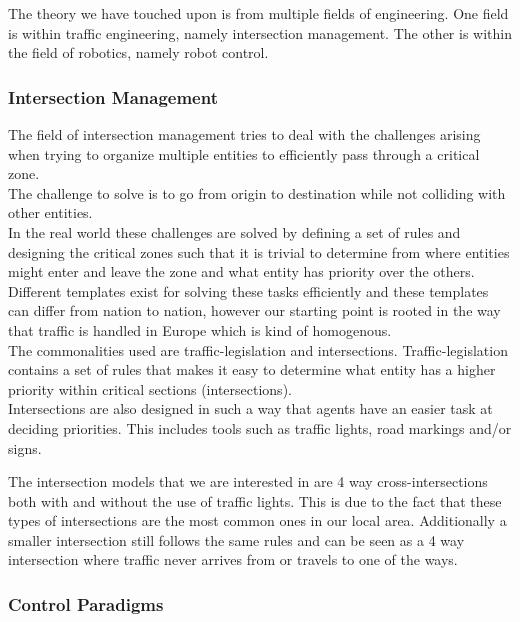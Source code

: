 The theory we have touched upon is from multiple fields of engineering. One field is within traffic engineering, namely intersection management. The other is within the field of robotics, namely robot control.

\subsubsection{Intersection Management}
The field of intersection management tries to deal with the challenges arising when trying to organize multiple entities to efficiently pass through a critical zone.\\
The challenge to solve is to go from origin to destination while not colliding with other entities.\\

In the real world these challenges are solved by defining a set of rules and designing the critical zones such that it is trivial to determine from where entities might enter and leave the zone and what entity has priority over the others.\\

Different templates exist for solving these tasks efficiently and these templates can differ from nation to nation, however our starting point is rooted in the way that traffic is handled in Europe which is kind of homogenous.\\

The commonalities used are traffic-legislation and intersections.
Traffic-legislation contains a set of rules that makes it easy to determine what entity has a higher priority within critical sections (intersections).\\
Intersections are also designed in such a way that agents have an easier task at deciding priorities. 
This includes tools such as traffic lights, road markings and/or signs.

The intersection models that we are interested in are 4 way cross-intersections both with and without the use of traffic lights.
This is due to the fact that these types of intersections are the most common ones in our local area. Additionally a smaller intersection still follows the same rules and can be seen as a 4 way intersection where traffic never arrives from or travels to one of the ways.

\subsubsection{Control Paradigms}

